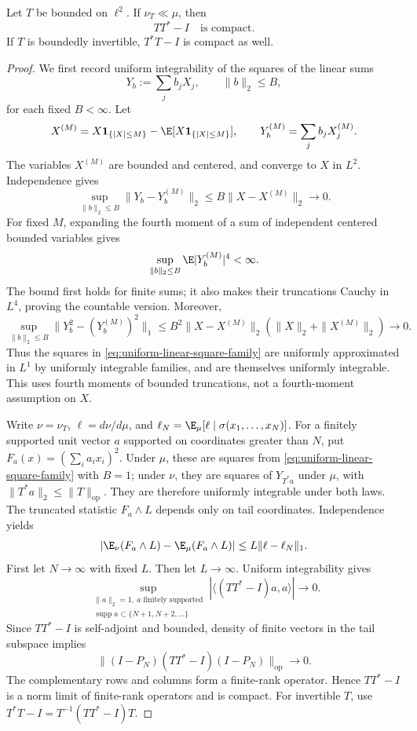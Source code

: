 \begin{lemma}
\label{lem:compact-covariance-rigidity}
Let $T$ be bounded on $\ell^2$.  If $\nu_T\ll\mu$, then
\[
 TT^*-I\quad\text{is compact}.
\]
If $T$ is boundedly invertible, $T^*T-I$ is compact as well.
\end{lemma}
\begin{proof}
We first record uniform integrability of the squares of the linear sums
\begin{equation}
 Y_b:=\sum_jb_jX_j,\qquad \|b\|_2\leq B,
 \label{eq:uniform-linear-square-family}
\end{equation}
for each fixed $B<\infty$.  Let
\[
 X^{(M)}=X\mathbf1_{\{|X|\leq M\}}
           -\E[X\mathbf1_{\{|X|\leq M\}}],
 \qquad Y_b^{(M)}=\sum_jb_jX_j^{(M)}.
\]
The variables $X^{(M)}$ are bounded and centered, and converge to $X$
in $L^2$.  Independence gives
\[
 \sup_{\|b\|_2\leq B}\|Y_b-Y_b^{(M)}\|_2
 \leq B\|X-X^{(M)}\|_2\longrightarrow0.
\]
For fixed $M$, expanding the fourth moment of a sum of independent
centered bounded variables gives
\[
 \sup_{\|b\|_2\leq B}\E|Y_b^{(M)}|^4<\infty.
\]
The bound first holds for finite sums; it also makes their truncations
Cauchy in $L^4$, proving the countable version.  Moreover,
\[
 \sup_{\|b\|_2\leq B}
 \bigl\|Y_b^2-(Y_b^{(M)})^2\bigr\|_1
 \leq B^2\|X-X^{(M)}\|_2
                  (\|X\|_2+\|X^{(M)}\|_2)
 \longrightarrow0.
\]
Thus the squares in \eqref{eq:uniform-linear-square-family}
are uniformly approximated in $L^1$ by uniformly integrable families,
and are themselves uniformly integrable.  This uses fourth moments of
bounded truncations, not a fourth-moment assumption on $X$.

Write $\nu=\nu_T$, $\ell=d\nu/d\mu$, and
$\ell_N=\E_\mu[\ell\mid\sigma(x_1,\ldots,x_N)]$.
For a finitely supported unit vector $a$ supported on coordinates greater than
$N$, put
$F_a(x)=(\sum_i a_ix_i)^2$.  Under $\mu$, these are squares from
\eqref{eq:uniform-linear-square-family} with $B=1$; under $\nu$,
they are squares of $Y_{T^*a}$ under $\mu$, with
$\|T^*a\|_2\leq\|T\|_{\mathrm{op}}$.  They are therefore uniformly integrable
under both laws.  The truncated statistic $F_a\wedge L$ depends only
on tail coordinates.  Independence yields
\[
 \left|\E_\nu(F_a\wedge L)-\E_\mu(F_a\wedge L)\right|
 \leq L\|\ell-\ell_N\|_1.
\]
First let $N\to\infty$ with fixed $L$.
Then let $L\to\infty$.
Uniform integrability gives
\[
 \sup_{\substack{\|a\|_2=1,\ a\text{ finitely supported}\\
                  \operatorname{supp}a\subset\{N+1,N+2,\ldots\}}}
 \left|\langle(TT^*-I)a,a\rangle\right|\longrightarrow0.
\]
Since $TT^*-I$ is self-adjoint and bounded, density of finite vectors
in the tail subspace implies
\[
 \|(I-P_N)(TT^*-I)(I-P_N)\|_{\mathrm{op}}\longrightarrow0.
\]
The complementary rows and columns form a finite-rank operator.  Hence
$TT^*-I$ is a norm limit of finite-rank operators and is compact.
For invertible $T$, use
$T^*T-I=T^{-1}(TT^*-I)T$.
\end{proof}

